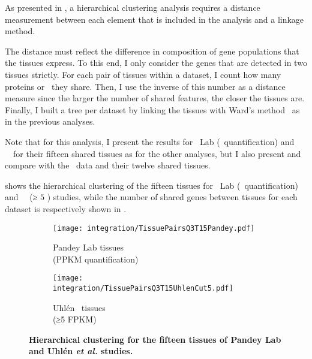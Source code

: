 As presented in ,
a hierarchical clustering analysis requires
a distance measurement between each element that is included in the analysis
and a linkage method.

The distance must reflect the difference in composition of gene populations
that the tissues express.
To this end,
I only consider the genes that are detected in two tissues strictly.
For each pair of tissues within a dataset,
I count how many proteins or \mRNAs\ they share.
Then, I use the inverse of this number as a distance measure
since the larger the number of shared features,
the closer the tissues are.
Finally, I built a tree per dataset
by linking the tissues with Ward's method~
as in the previous analyses.

Note that for this analysis,
I present the results for \pandey\ Lab (\PPKM\ quantification) and \uhlen\ \etal\
for their fifteen shared tissues as for the other analyses,
but I also present and compare with the \gtex\ data and their twelve shared tissues.

 shows the hierarchical clustering of the fifteen tissues
for \pandey\ Lab (\PPKM\ quantification)
and \uhlen\ \etal\ (≥ $5$ \FPKM)  studies,
while the number of shared genes between tissues
for each dataset is respectively shown
in .

\vspace{-4mm}
\begin{figure}[!htpb]
    \begin{subfigure}[b]{0.53\textwidth}
        \captionsetup{margin=0.6cm,justification=centering}
        \centering \texttt{[image: integration/TissuePairsQ3T15Pandey.pdf]}
        \caption{Pandey Lab tissues\\(PPKM quantification)}\label{fig:treePandeyQ3T15}
    \end{subfigure}%
    \begin{subfigure}[b]{0.53\textwidth}
        \captionsetup{margin=0.6cm,justification=centering}
        \centering \texttt{[image: integration/TissuePairsQ3T15UhlenCut5.pdf]}
        \caption{Uhlén \etal\ tissues\\(≥5 FPKM)}\label{fig:treeUhlenQ3T15cuth5}
    \end{subfigure}
    \vspace{-6mm}
    \caption[Tissues hierachical clustering for Pandey Lab and Uhlén \etal\ data]{\label{fig:separateTree}%
    \textbf{Hierarchical clustering for the fifteen tissues of
    Pandey Lab and Uhlén \textit{et al.} studies.}
    }
\end{figure}

